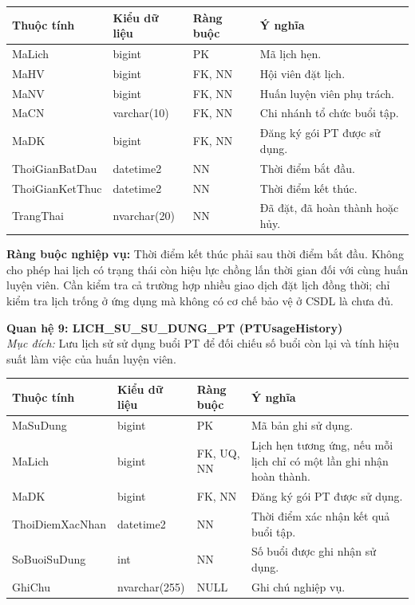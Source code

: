 \documentclass[11pt, a4paper]{article}
\begin{document}
\begin{small}
\begin{tabularx}{\textwidth}{| C{2.8cm} | C{2.4cm} | C{2.2cm} | Y |}
\hline
\textbf{Thuộc tính} & \textbf{Kiểu dữ liệu} & \textbf{Ràng buộc} & \textbf{Ý nghĩa} \\
\hline
MaLich & bigint & PK & Mã lịch hẹn. \\
\hline
MaHV & bigint & FK, NN & Hội viên đặt lịch. \\
\hline
MaNV & bigint & FK, NN & Huấn luyện viên phụ trách. \\
\hline
MaCN & varchar(10) & FK, NN & Chi nhánh tổ chức buổi tập. \\
\hline
MaDK & bigint & FK, NN & Đăng ký gói PT được sử dụng. \\
\hline
ThoiGianBatDau & datetime2 & NN & Thời điểm bắt đầu. \\
\hline
ThoiGianKetThuc & datetime2 & NN & Thời điểm kết thúc. \\
\hline
TrangThai & nvarchar(20) & NN & Đã đặt, đã hoàn thành hoặc hủy. \\
\hline
\end{tabularx}
\end{small}

\textbf{Ràng buộc nghiệp vụ:} Thời điểm kết thúc phải sau thời điểm bắt đầu. Không cho phép hai lịch có trạng thái còn hiệu lực chồng lấn thời gian đối với cùng huấn luyện viên. Cần kiểm tra cả trường hợp nhiều giao dịch đặt lịch đồng thời; chỉ kiểm tra lịch trống ở ứng dụng mà không có cơ chế bảo vệ ở CSDL là chưa đủ.

\vspace{0.8em}
\textbf{Quan hệ 9: LICH\_SU\_SU\_DUNG\_PT (PTUsageHistory)} \\
\textit{Mục đích:} Lưu lịch sử sử dụng buổi PT để đối chiếu số buổi còn lại và tính hiệu suất làm việc của huấn luyện viên.

\begin{small}
\begin{tabularx}{\textwidth}{| C{3.2cm} | C{2.2cm} | C{2.4cm} | Y |}
\hline
\textbf{Thuộc tính} & \textbf{Kiểu dữ liệu} & \textbf{Ràng buộc} & \textbf{Ý nghĩa} \\
\hline
MaSuDung & bigint & PK & Mã bản ghi sử dụng. \\
\hline
MaLich & bigint & FK, UQ, NN & Lịch hẹn tương ứng, nếu mỗi lịch chỉ có một lần ghi nhận hoàn thành. \\
\hline
MaDK & bigint & FK, NN & Đăng ký gói PT được sử dụng. \\
\hline
ThoiDiemXacNhan & datetime2 & NN & Thời điểm xác nhận kết quả buổi tập. \\
\hline
SoBuoiSuDung & int & NN & Số buổi được ghi nhận sử dụng. \\
\hline
GhiChu & nvarchar(255) & NULL & Ghi chú nghiệp vụ. \\
\hline
\end{tabularx}
\end{small}
\end{document}
